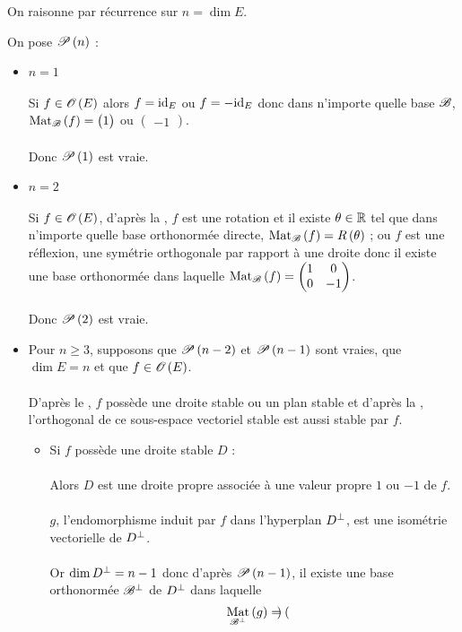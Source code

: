 \begin{dem}
On raisonne par récurrence sur \(n=\dim E\).

On pose \(\P{n}\) : 

\begin{itemize}
    \item \(n=1\) \\\\ Si \(f\in\Orth{}[E]\) alors \(f=\id{E}\) ou \(f=-\id{E}\) donc dans n'importe quelle base \(\fami{B}\), \(\Mat{f}=\begin{pmatrix}1\end{pmatrix}\) ou \(\begin{pmatrix}-1\end{pmatrix}\). \\\\ Donc \(\P{1}\) est vraie. \\
    \item \(n=2\) \\\\ Si \(f\in\Orth{}[E]\), d'après la , \(f\) est une rotation et il existe \(\theta\in\R\) tel que dans n'importe quelle base orthonormée directe, \(\Mat{f}=R\paren{\theta}\) ; ou \(f\) est une réflexion, \ie une symétrie orthogonale par rapport à une droite donc il existe une base orthonormée dans laquelle \(\Mat{f}=\begin{pmatrix}
        1 & 0 \\
        0 & -1
    \end{pmatrix}\). \\\\ Donc \(\P{2}\) est vraie. \\
    \item Pour \(n\geq3\), supposons que \(\P{n-2}\) et \(\P{n-1}\) sont vraies, que \(\dim E=n\) et que \(f\in\Orth{}[E]\). \\\\ D'après le , \(f\) possède une droite stable ou un plan stable et d'après la , l'orthogonal de ce sous-espace vectoriel stable est aussi stable par \(f\). \\ \begin{itemize}
        \item Si \(f\) possède une droite stable \(D\) : \\\\ Alors \(D\) est une droite propre associée à une valeur propre \(1\) ou \(-1\) de \(f\). \\\\ \(g\), l'endomorphisme induit par \(f\) dans l'hyperplan \(D\ortho\), est une isométrie vectorielle de \(D\ortho\). \\\\ Or \(\dim D\ortho=n-1\) donc d'après \(\P{n-1}\), il existe une base orthonormée \(\fami{B}\ortho\) de \(D\ortho\) dans laquelle \[\Mat[\fami{B}\ortho]{g}=\begin{pmatrix}

\end{pmatrix}\]
\end{itemize}
\end{itemize}
\end{dem}
